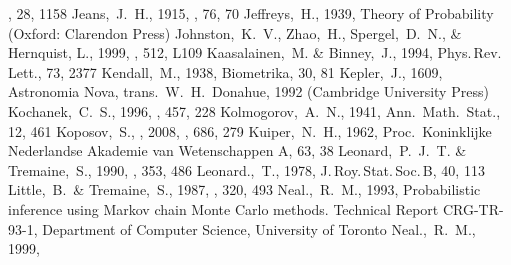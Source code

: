 \begin{thebibliography}{99}
  \baas, 28, 1158
  Jeans,~J.~H., 1915,
  \mnras, 76, 70
  Jeffreys,~H., 1939,
  Theory of Probability (Oxford: Clarendon Press)
  Johnston,~K.~V., Zhao,~H., Spergel,~D.~N., \& Hernquist, L., 1999,
  \apjl, 512, L109 
  Kaasalainen,~M. \& Binney,~J., 1994,
  Phys.\,Rev.\,Lett., 73, 2377
  Kendall,~M., 1938,
  Biometrika, 30, 81
  Kepler,~J., 1609,
  Astronomia Nova,
  trans.\ W.~H.~Donahue, 1992
  (Cambridge University Press)
  Kochanek,~C.~S., 1996,
  \apj, 457, 228
  Kolmogorov,~A.~N., 1941,
  Ann.~Math.~Stat., 12, 461
  Koposov,~S., \etal, 2008,
  \apj, 686, 279
  Kuiper,~N.~H., 1962,
  Proc.~Koninklijke Nederlandse Akademie van Wetenschappen A, 63, 38
  Leonard,~P.~J.~T. \& Tremaine,~S., 1990,
  \apj, 353, 486
  Leonard.,~T., 1978,
  J.\,Roy.\,Stat.\,Soc.\,B, 40, 113
  Little,~B.~\& Tremaine,~S., 1987,
  \apj, 320, 493
  Neal.,~R.~M., 1993,
  Probabilistic inference using {M}arkov chain {M}onte {C}arlo methods.
  Technical Report CRG-TR-93-1, Department of Computer Science,
  University of Toronto
  Neal.,~R.~M., 1999,

\end{thebibliography}
